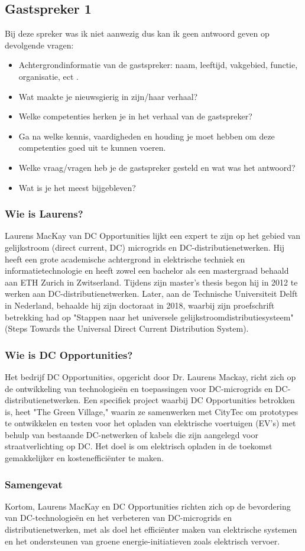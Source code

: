 \subsection{Gastspreker 1}
Bij deze spreker was ik niet aanwezig dus kan ik geen antwoord geven op devolgende vragen:
\begin{itemize}
    \item Achtergrondinformatie van de gastspreker: naam, leeftijd, vakgebied, functie, organisatie, ect    .
    \item Wat maakte je nieuwsgierig in zijn/haar verhaal?
    \item Welke competenties herken je in het verhaal van de gastspreker?
    \item Ga na welke kennis, vaardigheden en houding je moet hebben om deze competenties goed uit te kunnen voeren.
    \item Welke vraag/vragen heb je de gastspreker gesteld en wat was het antwoord?
    \item Wat is je het meest bijgebleven?
\end{itemize}
\subsubsection{Wie is Laurens?}
Laurens MacKay van DC Opportunities lijkt een expert te zijn op het gebied van gelijkstroom (direct current, DC) microgrids en DC-distributienetwerken. Hij heeft een grote academische achtergrond in elektrische techniek en informatietechnologie en heeft zowel een bachelor als een mastergraad behaald aan ETH Zurich in Zwitserland. Tijdens zijn master's thesis begon hij in 2012 te werken aan DC-distributienetwerken. Later, aan de Technische Universiteit Delft in Nederland, behaalde hij zijn doctoraat in 2018, waarbij zijn proefschrift betrekking had op "Stappen naar het universele gelijkstroomdistributiesysteem" (Steps Towards the Universal Direct Current Distribution System).\cite{LaurensLINKEDIN}
\subsubsection{Wie is DC Opportunities?}
Het bedrijf DC Opportunities, opgericht door Dr. Laurens Mackay, richt zich op de ontwikkeling van technologieën en toepassingen voor DC-microgrids en DC-distributienetwerken. Een specifiek project waarbij DC Opportunities betrokken is, heet "The Green Village," waarin ze samenwerken met CityTec om prototypes te ontwikkelen en testen voor het opladen van elektrische voertuigen (EV's) met behulp van bestaande DC-netwerken of kabels die zijn aangelegd voor straatverlichting op DC. Het doel is om elektrisch opladen in de toekomst gemakkelijker en kostenefficiënter te maken. \cite{DCSITE} \cite{DCLINKEDIN} \cite{Innovation_Quarter}
\subsubsection{Samengevat}
Kortom, Laurens MacKay en DC Opportunities richten zich op de bevordering van DC-technologieën en het verbeteren van DC-microgrids en distributienetwerken, met als doel het efficiënter maken van elektrische systemen en het ondersteunen van groene energie-initiatieven zoals elektrisch vervoer.